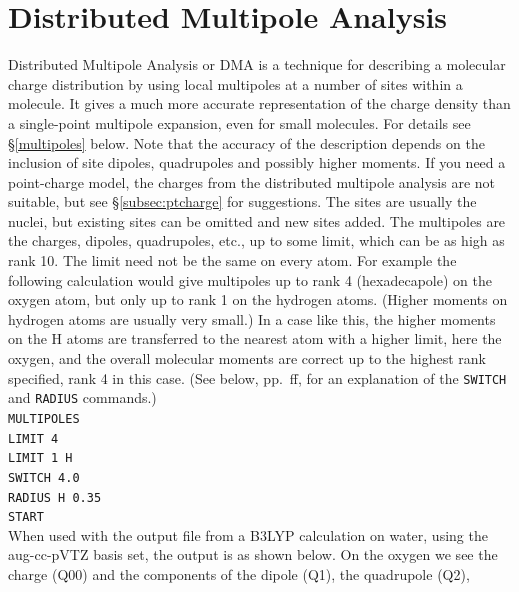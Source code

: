 \documentclass[12pt,txfonts]{paper}
\begin{document}
\section {Distributed Multipole Analysis}

Distributed Multipole Analysis or DMA is a technique for describing a
molecular charge distribution by using
local multipoles at a number of sites within a molecule. It gives a
much more accurate representation of the charge density than a
single-point multipole expansion, even for small molecules. For
details see \S\ref{multipoles} below. Note that the accuracy of the
description depends on the inclusion of site dipoles, quadrupoles and
possibly higher moments. If you need a point-charge model, the charges
from the distributed multipole analysis are not suitable, but see
\S\ref{subsec:ptcharge} for suggestions. The sites
are usually the nuclei, but existing sites can be omitted and
new sites added. The multipoles are the charges,
dipoles, quadrupoles, etc., up to some limit, which can be as high as
rank 10. The limit need not be the same on every atom. For example the
following 
calculation would give multipoles up to rank 4 (hexadecapole) on the
oxygen atom, but only up to rank 1 on the hydrogen atoms. (Higher
moments on hydrogen atoms are usually very small.) In a case like
this, the higher moments on the H atoms are
transferred to the nearest atom with a higher limit, here the oxygen,
and the overall molecular moments are correct up to the highest rank
specified, rank 4 in this case. (See below, pp.~\pageref{p:switch}ff, for
an explanation of the \verb+SWITCH+ and \verb+RADIUS+ commands.)\\
\hspace*{2 em}\verb/MULTIPOLES/\\
\hspace*{2 em}\verb/LIMIT 4/\\
\hspace*{2 em}\verb/LIMIT 1 H/\\
\hspace*{2 em}\verb/SWITCH 4.0/\\
\hspace*{2 em}\verb/RADIUS H 0.35/\\
\hspace*{2 em}\verb/START/\\
When used with the output file from a B3LYP calculation on water,
using the aug-cc-pVTZ basis set, the
output is as shown %
below.  On the oxygen we see the
charge (Q00) and the components of the dipole (Q1), the quadrupole (Q2),
\end{document}
